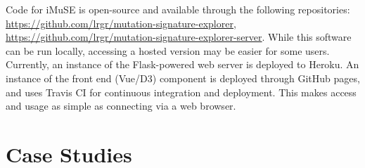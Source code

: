 \documentclass[12pt, letterpaper]{article}
\begin{document}
Code for iMuSE is open-source and available through the following repositories: \url{https://github.com/lrgr/mutation-signature-explorer}, \url{https://github.com/lrgr/mutation-signature-explorer-server}.
While this software can be run locally, accessing a hosted version may be easier for some users.
Currently, an instance of the Flask-powered web server is deployed to Heroku.
An instance of the front end (Vue/D3) component is deployed through GitHub pages, and uses Travis CI for continuous integration and deployment.
This makes access and usage as simple as connecting via a web browser.


\section{Case Studies}
\end{document}
